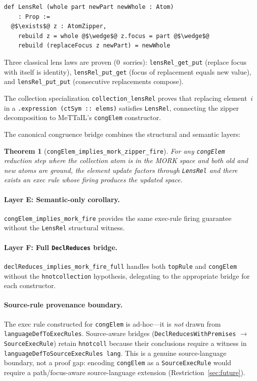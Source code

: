 \documentclass[11pt]{article}
\newtheorem{theorem}{Theorem}[section]
\theoremstyle{definition}
\theoremstyle{remark}
\newcommand{\MORK}{\textup{MORK}}
\newcommand{\MeTTaIL}{\textup{MeTTaIL}}
\begin{document}
\begin{lstlisting}
def LensRel (whole part newPart newWhole : Atom)
    : Prop :=
  @$\exists$@ z : AtomZipper,
    rebuild z = whole @$\wedge$@ z.focus = part @$\wedge$@
    rebuild (replaceFocus z newPart) = newWhole
\end{lstlisting}

\noindent
Three classical lens laws are proven (0~sorries):
\texttt{lensRel\_get\_put} (replace focus with itself is identity),
\texttt{lensRel\_put\_get} (focus of replacement equals new value),
and \texttt{lensRel\_put\_put} (consecutive replacements compose).

The collection specialization \texttt{collection\_lensRel} proves
that replacing element~$i$ in a \texttt{.expression (ctSym :: elems)}
satisfies \texttt{LensRel}, connecting the zipper decomposition to
\MeTTaIL{}'s \texttt{congElem} constructor.

The canonical congruence bridge combines the structural and semantic layers:

\begin{theorem}[\texttt{congElem\_implies\_mork\_zipper\_fire}]
\label{thm:congelemzipper}
For any \texttt{congElem} reduction step where the collection atom is
in the \MORK{} space and both old and new atoms are ground, the
element update factors through \texttt{LensRel} \emph{and} there exists
an exec rule whose firing produces the updated space.
\end{theorem}

\paragraph{Layer E: Semantic-only corollary.}
\texttt{congElem\_implies\_mork\_fire} provides the same exec-rule
firing guarantee without the \texttt{LensRel} structural witness.

\paragraph{Layer F: Full \texttt{DeclReduces} bridge.}
\texttt{declReduces\_implies\_mork\_fire\_full} handles both
\texttt{topRule} and \texttt{congElem} without the
\texttt{hnotcollection} hypothesis, delegating to the appropriate
bridge for each constructor.

\paragraph{Source-rule provenance boundary.}
The exec rule constructed for \texttt{congElem} is ad-hoc---it is
\emph{not} drawn from \texttt{languageDefToExecRules}.  Source-aware
bridges (\texttt{DeclReducesWithPremises} $\to$ \texttt{SourceExecRule})
retain \texttt{hnotcoll} because their conclusions require a witness in
\texttt{languageDefToSourceExecRules lang}.  This is a genuine
source-language boundary, not a proof gap: encoding \texttt{congElem}
as a \texttt{SourceExecRule} would require a path/focus-aware
source-language extension (Restriction~\ref{sec:future}).
\end{document}
